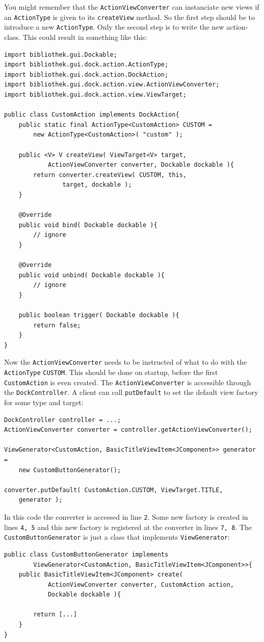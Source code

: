 \documentclass[a4paper,10pt]{article}
\newcommand{\src}[1]{\texttt{#1}}
\begin{document}
You might remember that the \src{ActionViewConverter} can instanciate new views if an \src{ActionType} is given to its \src{createView} method. So the first step should be to introduce a new \src{ActionType}. Only the second step is to write the new action-class. This could result in something like this:
\begin{lstlisting}
import bibliothek.gui.Dockable;
import bibliothek.gui.dock.action.ActionType;
import bibliothek.gui.dock.action.DockAction;
import bibliothek.gui.dock.action.view.ActionViewConverter;
import bibliothek.gui.dock.action.view.ViewTarget;

public class CustomAction implements DockAction{
	public static final ActionType<CustomAction> CUSTOM =
		new ActionType<CustomAction>( "custom" );
	
	public <V> V createView( ViewTarget<V> target,
			ActionViewConverter converter, Dockable dockable ){
		return converter.createView( CUSTOM, this, 
				target, dockable );
	}
	
	@Override
	public void bind( Dockable dockable ){
		// ignore
	}
	
	@Override
	public void unbind( Dockable dockable ){
		// ignore
	}
	
	public boolean trigger( Dockable dockable ){
		return false;
	}	
}
\end{lstlisting}

Now the \src{ActionViewConverter} needs to be instructed of what to do with the \src{ActionType} \src{CUSTOM}. This should be done on startup, before the first \linebreak \src{CustomAction} is even created. The \src{ActionViewConverter} is accessible through the \src{DockController}. A client can call \src{putDefault} to set the default view factory for some type and target:

\begin{lstlisting}
DockController controller = ...;
ActionViewConverter converter = controller.getActionViewConverter();

ViewGenerator<CustomAction, BasicTitleViewItem<JComponent>> generator =
	new CustomButtonGenerator();

converter.putDefault( CustomAction.CUSTOM, ViewTarget.TITLE, 
	generator );
\end{lstlisting}
In this code the converter is accessed in line \src{2}. Some new factory is created in lines \src{4, 5} and this new factory is registered at the converter in lines \src{7, 8}. The \src{CustomButtonGenerator} is just a class that implements \src{ViewGenerator}:
\begin{lstlisting}
public class CustomButtonGenerator implements
		ViewGenerator<CustomAction, BasicTitleViewItem<JComponent>>{
	public BasicTitleViewItem<JComponent> create(
			ActionViewConverter converter, CustomAction action,
			Dockable dockable ){
		
		return [...]
	}
}
\end{lstlisting}
\end{document}
